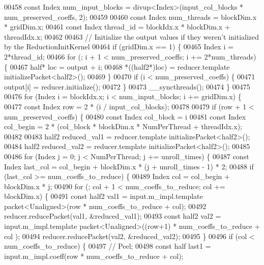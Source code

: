 \begin{DoxyCode}
00458   \textcolor{keyword}{const} Index num\_input\_blocks = divup<Index>(input\_col\_blocks * num\_preserved\_coeffs, 2);
00459 
00460   \textcolor{keyword}{const} Index num\_threads = blockDim.x * gridDim.x;
00461   \textcolor{keyword}{const} Index thread\_id = blockIdx.x * blockDim.x + threadIdx.x;
00462 
00463   \textcolor{comment}{// Initialize the output values if they weren't initialized by the ReductionInitKernel}
00464   \textcolor{keywordflow}{if} (gridDim.x == 1) \{
00465     Index i = 2*thread\_id;
00466     \textcolor{keywordflow}{for} (; i + 1 < num\_preserved\_coeffs; i += 2*num\_threads) \{
00467       half* loc = output + i;
00468       *((half2*)loc) = reducer.template initializePacket<half2>();
00469     \}
00470     \textcolor{keywordflow}{if} (i < num\_preserved\_coeffs) \{
00471       output[i] = reducer.initialize();
00472     \}
00473     \_\_syncthreads();
00474   \}
00475 
00476   \textcolor{keywordflow}{for} (Index i = blockIdx.x; i < num\_input\_blocks; i += gridDim.x) \{
00477     \textcolor{keyword}{const} Index row = 2 * (i / input\_col\_blocks);
00478 
00479     \textcolor{keywordflow}{if} (row + 1 < num\_preserved\_coeffs) \{
00480       \textcolor{keyword}{const} Index col\_block = i %
00481       \textcolor{keyword}{const} Index col\_begin = 2 * (col\_block * blockDim.x * NumPerThread + threadIdx.x);
00482 
00483       half2 reduced\_val1 = reducer.template initializePacket<half2>();
00484       half2 reduced\_val2 = reducer.template initializePacket<half2>();
00485 
00486       \textcolor{keywordflow}{for} (Index j = 0; j < NumPerThread; j += unroll\_times) \{
00487         \textcolor{keyword}{const} Index last\_col = col\_begin + blockDim.x * (j + unroll\_times - 1) * 2;
00488         \textcolor{keywordflow}{if} (last\_col >= num\_coeffs\_to\_reduce) \{
00489           Index col = col\_begin + blockDim.x * j;
00490           \textcolor{keywordflow}{for} (; col + 1 < num\_coeffs\_to\_reduce; col += blockDim.x) \{
00491             \textcolor{keyword}{const} half2 val1 = input.m\_impl.template packet<Unaligned>(row * num\_coeffs\_to\_reduce + col);
00492             reducer.reducePacket(val1, &reduced\_val1);
00493             \textcolor{keyword}{const} half2 val2 = input.m\_impl.template packet<Unaligned>((row+1) * num\_coeffs\_to\_reduce + col
      );
00494             reducer.reducePacket(val2, &reduced\_val2);
00495           \}
00496           \textcolor{keywordflow}{if} (col < num\_coeffs\_to\_reduce) \{
00497             \textcolor{comment}{// Peel;}
00498             \textcolor{keyword}{const} half last1 = input.m\_impl.coeff(row * num\_coeffs\_to\_reduce + col);

\end{DoxyCode}
